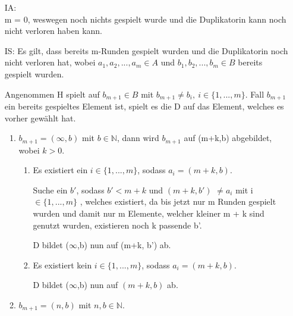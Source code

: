 \documentclass[a4paper,10pt]{article}
\begin{document}
	\begin{enumerate}

	\item[IA:] ~\\
		m = 0, weswegen noch nichts gespielt wurde und die Duplikatorin kann noch nicht verloren haben kann.
		
	\item[IS:]
		Es gilt, dass bereits m-Runden gespielt wurden und die Duplikatorin noch nicht verloren hat, wobei
		$a_1,a_2,...,a_m \in A$ und $b_1,b_2,...,b_m \in B$ bereits gespielt wurden.
		
		Angenommen H spielt auf $b_{m+1} \in B$ mit $b_{m+1} \neq b_i,~ i \in \{1,...,m\}$. Fall $b_{m+1}$ ein bereits gespieltes Element ist, 	
		spielt es die D auf das Element, welches es vorher gewählt hat.
		
		\item[]
		\begin{enumerate}
			\item
				$b_{m+1} = (\infty, b)$ mit $b \in \mathbb{N}$, dann wird $b_{m+1}$ auf (m+k,b) abgebildet, wobei $k > 0$.
				\begin{enumerate}
					\item	
						Es existiert ein $i \in \{1,...,m\}$, sodass $a_i = (m+k,b)$. 
						
						Suche ein $b'$, sodass $b' < m + k$ und $(m+k,b')$ $\neq a_i$ mit i $\in \{1,...,m\}$ , welches existiert, da bis 
						jetzt nur m Runden gespielt wurden und damit nur m Elemente, welcher kleiner m + k
						sind genutzt wurden, existieren noch k passende b'. 
						
						D bildet ($\infty$,b) nun auf (m+k, b') ab.
						
					\item 
						Es existiert kein $i \in \{1,...,m\}$, sodass $a_i = (m+k,b)$. 
						
						
						D bildet ($\infty$,b) nun auf $(m+k, b)$ ab.
				\end{enumerate}
			\item
				$b_{m+1} = (n,b)$ mit $n,b \in \mathbb{N}$.
				

\end{enumerate}
\end{enumerate}
\end{document}
